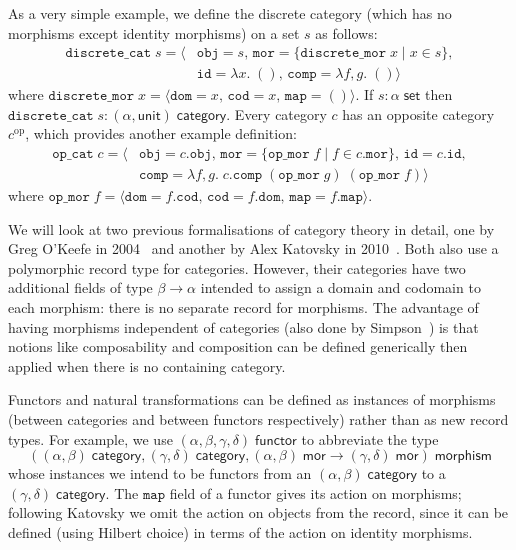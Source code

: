 \documentclass[twoside,titlepage,11pt]{article}
\begin{document}
As a very simple example, we define the discrete category (which has no morphisms except identity morphisms) on a set $s$ as follows:
\begin{align*}
\mathtt{discrete\_cat}\;s=\langle&\mathtt{obj}=s,\,\mathtt{mor}=\{\mathtt{discrete\_mor}\;x\mid x\in s\},\\&\mathtt{id}=\lambda{x}.\;(),\,\mathtt{comp}=\lambda{f,g}.\;()\rangle
\end{align*}
where $\mathtt{discrete\_mor}\;x=\langle\mathtt{dom}=x,\,\mathtt{cod}=x,\,\mathtt{map}=()\rangle$.
If $s:\alpha\;\mathsf{set}$ then $\mathtt{discrete\_cat}\;s:(\alpha,\mathsf{unit})\;\mathsf{category}$.
Every category $c$ has an opposite category $c^{\mathrm{op}}$, which provides another example definition:
\begin{align*}
\mathtt{op\_cat}\;c=\langle&\mathtt{obj}=c.\mathtt{obj},\,\mathtt{mor}=\{\mathtt{op\_mor}\;f\mid f\in c.\mathtt{mor}\},\,\mathtt{id}=c.\mathtt{id},\\&\mathtt{comp}=\lambda{f,g}.\;c.\mathtt{comp}\;(\mathtt{op\_mor}\;g)\;(\mathtt{op\_mor}\;f)\rangle
\end{align*}
where $\mathtt{op\_mor}\;f=\langle\mathtt{dom}=f.\mathtt{cod},\,\mathtt{cod}=f.\mathtt{dom},\,\mathtt{map}=f.\mathtt{map}\rangle$.

We will look at two previous formalisations of category theory in detail, one by Greg O'Keefe in 2004~\cite{DBLP:journals/entcs/OKeefe04} and another by Alex Katovsky in 2010~\cite{Katovsky}.
Both also use a polymorphic record type for categories.
However, their categories have two additional fields of type $\beta\to\alpha$ intended to assign a domain and codomain to each morphism: there is no separate record for morphisms.
The advantage of having morphisms independent of categories (also done by Simpson~\cite{Simpson04}) is that notions like composability and composition can be defined generically then applied when there is no containing category.

Functors and natural transformations can be defined as instances of morphisms (between categories and between functors respectively) rather than as new record types.
For example, we use $(\alpha,\beta,\gamma,\delta)\;\mathsf{functor}$ to abbreviate the type \[((\alpha,\beta)\;\mathsf{category},(\gamma,\delta)\;\mathsf{category},(\alpha,\beta)\;\mathsf{mor}\to(\gamma,\delta)\;\mathsf{mor})\;\mathsf{morphism}\] whose instances we intend to be functors from an $(\alpha,\beta)\;\mathsf{category}$ to a $(\gamma,\delta)\;\mathsf{category}$.
The $\mathtt{map}$ field of a functor gives its action on morphisms; following Katovsky we omit the action on objects from the record, since it can be defined (using Hilbert choice) in terms of the action on identity morphisms.
\end{document}
